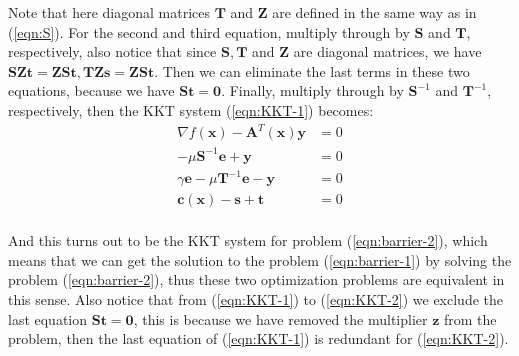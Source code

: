 \documentclass[12pt]{article}
\newcommand{\mb}{\mathbf}
\begin{document}
Note that here diagonal matrices $\mb{T}$ and $\mb{Z}$ are defined in the same way as in (\ref{eqn:S}). For the second and third equation, multiply through by $\mb{S}$ and $\mb{T}$, respectively, also notice that since $\mb{S}, \mb{T}$ and $\mb{Z}$ are diagonal matrices, we have $\mb{S} \mb{Z} \mb{t}= \mb{Z} \mb{S} \mb{t}, \mb{T}\mb{Z} \mb{s} = \mb{Z}\mb{S}\mb{t}$. Then we can eliminate the last terms in these two equations, because we have $\mb{S}\mb{t}=\mb{0}$. Finally, multiply through by $\mb{S}^{-1}$ and $\mb{T}^{-1}$, respectively, then the KKT system (\ref{eqn:KKT-1}) becomes:
%
\begin{equation}
  \label{eqn:KKT-2}
  \begin{aligned}
    \nabla f(\mb{x}) - \mb{A}^T(\mb{x}) \mb{y} &= 0\\
    - \mu \mb{S}^{-1} \mb{e} + \mb{y}  &=  0\\
    \gamma \mb{e} - \mu \mb{T}^{-1} \mb{e} - \mb{y} &= 0 \\
    \mb{c}(\mb{x}) - \mb{s} + \mb{t} &= 0\\
  \end{aligned}
\end{equation}

And this turns out to be the KKT system for problem (\ref{eqn:barrier-2}), which means that we can get the solution to the problem (\ref{eqn:barrier-1}) by solving the problem (\ref{eqn:barrier-2}), thus these two optimization problems are equivalent in this sense. Also notice that from (\ref{eqn:KKT-1}) to (\ref{eqn:KKT-2}) we exclude the last equation $\mb{S}\mb{t} = \mb{0}$, this is because we have removed the multiplier $\mb{z}$ from the problem, then the last equation of (\ref{eqn:KKT-1}) is redundant for (\ref{eqn:KKT-2}).
\end{document}

